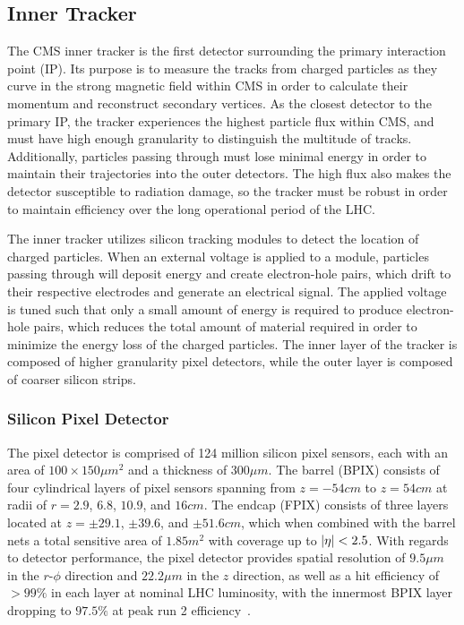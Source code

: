 \subsection{Inner Tracker} \label{sec:CMS_tracker}
The CMS inner tracker is the first detector surrounding the primary interaction point (IP). Its purpose is to measure the tracks from charged particles as they curve in the strong magnetic field within CMS in order to calculate their momentum and reconstruct secondary vertices. As the closest detector to the primary IP, the tracker experiences the highest particle flux within CMS, and must have high enough granularity to distinguish the multitude of tracks. Additionally, particles passing through must lose minimal energy in order to maintain their trajectories into the outer detectors. The high flux also makes the detector susceptible to radiation damage, so the tracker must be robust in order to maintain efficiency over the long operational period of the LHC.

The inner tracker utilizes silicon tracking modules to detect the location of charged particles. When an external voltage is applied to a module, particles passing through will deposit energy and create electron-hole pairs, which drift to their respective electrodes and generate an electrical signal. The applied voltage is tuned such that only a small amount of energy is required to produce electron-hole pairs, which reduces the total amount of material required in order to minimize the energy loss of the charged particles. The inner layer of the tracker is composed of higher granularity pixel detectors, while the outer layer is composed of coarser silicon strips.

\subsubsection{Silicon Pixel Detector} \label{sec:CMS_pixel}
The pixel detector is comprised of 124 million silicon pixel sensors, each with an area of $100\times150\unit{\mu m^2}$ and a thickness of $300\unit{\mu m}$. The barrel (BPIX) consists of four cylindrical layers of pixel sensors spanning from $z=-54\unit{cm}$ to $z=54\unit{cm}$ at radii of $r=2.9$, $6.8$, $10.9$, and $16\unit{cm}$. The endcap (FPIX) consists of three layers located at $z=\pm29.1$, $\pm39.6$, and $\pm51.6\unit{cm}$, which when combined with the barrel nets a total sensitive area of $1.85\unit{m^2}$ with coverage up to $\abs{\eta}<2.5$. With regards to detector performance, the pixel detector provides spatial resolution of $9.5 \unit{\mu m}$ in the $r$-$\phi$ direction and $22.2 \unit{\mu m}$ in the $z$ direction, as well as a hit efficiency of $>99\%$ in each layer at nominal LHC luminosity, with the innermost BPIX layer dropping to $97.5\%$ at peak run 2 efficiency~\cite{CMSPixelP1}.

